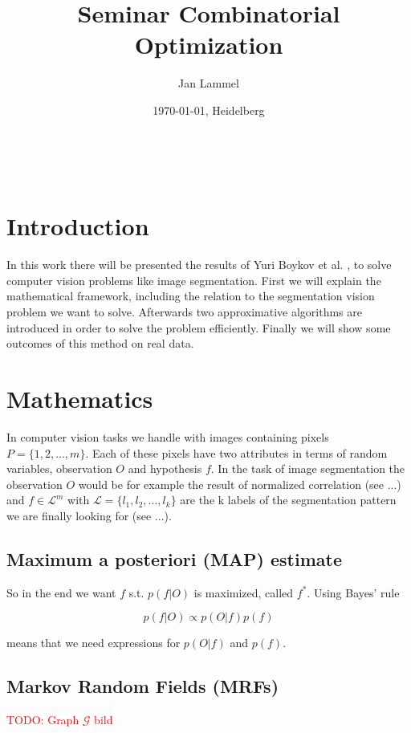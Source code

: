 \documentclass{scrartcl}[12pt, halfparskip]
\title{Seminar Combinatorial Optimization}
\author{Jan Lammel}
\date{\today{}, Heidelberg}
\newcommand{\todo}[1]{\textcolor{red}{TODO: #1}}
\begin{document}
\maketitle \ \\ 
\newpage


\section{Introduction}
In this work there will be presented the results of Yuri Boykov et al. \cite{boykov98}, \cite{boykov01} to solve computer vision problems like image segmentation. First we will explain the mathematical framework, including the relation to the segmentation vision problem we want to solve. Afterwards two approximative algorithms are introduced in order to solve the problem efficiently. Finally we will show some outcomes of this method on real data.


\section{Mathematics}
In computer vision tasks we handle with images containing pixels $P = \{ 1, 2, ..., m \}$. Each of these pixels have two attributes in terms of random variables, observation $O$ and hypothesis $f$. In the task of image segmentation the observation $O$ would be for example the result of normalized correlation (see ...) and $f \in \mathcal{L}^m$ with $\mathcal{L} = \{l_1,l_ 2, ..., l_k\}$ are the k labels of the segmentation pattern we are finally looking for (see ...). \\


\subsection{Maximum a posteriori (MAP) estimate}

So in the end we want $f$ s.t. $p(f|O)$ is maximized, called $f^*$. Using Bayes' rule

\begin{equation}
	p(f|O) \propto p(O|f) p(f)
\end{equation}

means that we need expressions for $p(O|f)$ and $p(f)$.


\subsection{Markov Random Fields (MRFs)}

\todo{Graph $\mathcal{G}$ bild}
\end{document}
